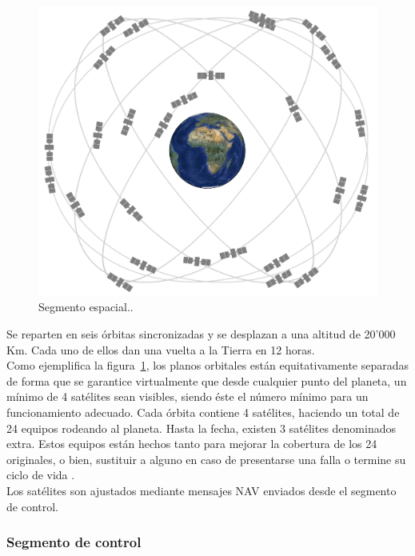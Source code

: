 \begin{figure}[H]
\centering
\includegraphics[scale=0.2]{Figures/constel}
\caption[Segmento espacial.]{Segmento espacial.\footnotemark.}
\label{fig:segEs}
\end{figure}


Se reparten en seis órbitas sincronizadas y se desplazan a una altitud de 20'000 Km. Cada uno de ellos dan una vuelta a la Tierra en 12 horas. \\

Como ejemplifica la figura~\ref{fig:segEs}, los planos orbitales están equitativamente separadas de forma que se garantice virtualmente que desde cualquier punto del planeta, un mínimo de 4 satélites sean visibles, siendo éste el número mínimo para un funcionamiento adecuado. Cada órbita contiene 4 satélites, haciendo un total de 24 equipos rodeando al planeta. Hasta la fecha, existen 3 satélites denominados extra. Estos equipos están hechos tanto para mejorar la cobertura de los 24 originales, o bien, sustituir a alguno en caso de presentarse una falla o termine su ciclo de vida \citep{gps_gov}.\\

Los satélites son ajustados mediante mensajes NAV enviados desde el segmento de control.

\subsubsection{Segmento de control}

